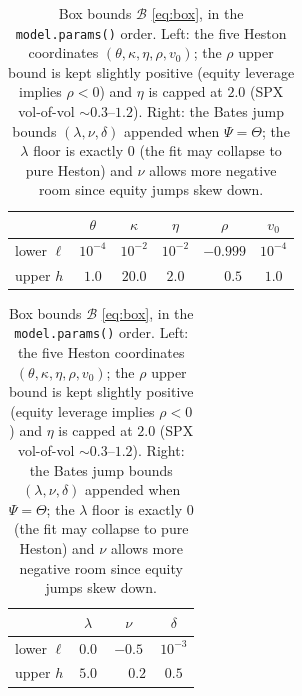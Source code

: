 \documentclass[a4paper, 11pt, reqno]{amsart}
\begin{document}
		\begin{table}[h]
		\centering
		\small
		\begin{tabular}{lccccc}
			\toprule
			& $\theta$ & $\kappa$ & $\eta$ & $\rho$ & $v_0$ \\
			\midrule
			lower $\ell$ & $10^{-4}$ & $10^{-2}$ & $10^{-2}$ & $-0.999$ & $10^{-4}$ \\
			upper $h$    & $1.0$     & $20.0$    & $2.0$     & $\phantom{-}0.5$ & $1.0$ \\
			\bottomrule
		\end{tabular}
		\qquad
		\begin{tabular}{lccc}
			\toprule
			& $\lambda$ & $\nu$ & $\delta$ \\
			\midrule
			lower $\ell$ & $0.0$ & $-0.5$ & $10^{-3}$ \\
			upper $h$    & $5.0$ & $\phantom{-}0.2$ & $0.5$ \\
			\bottomrule
		\end{tabular}
		\vspace*{-0.75em}
		\caption{Box bounds $\mathcal{B}$ \eqref{eq:box}, in the \texttt{model.params()} order. Left: the
		five Heston coordinates $(\theta,\kappa,\eta,\rho,v_0)$; the $\rho$ upper bound is kept slightly
		positive (equity leverage implies $\rho<0$) and $\eta$ is capped at $2.0$ (SPX vol-of-vol
		$\sim 0.3$--$1.2$). Right: the Bates jump bounds $(\lambda,\nu,\delta)$ appended when $\Psi=\Theta$;
		the $\lambda$ floor is exactly $0$ (the fit may collapse to pure Heston) and $\nu$ allows more
		negative room since equity jumps skew down.}
		\label{tab:bounds}\label{tab:bates-bounds}
		\end{table}
\end{document}
